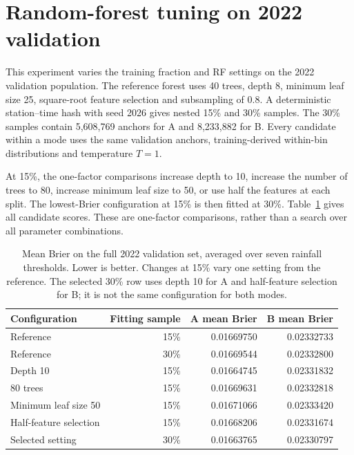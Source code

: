 \section{Random-forest tuning on 2022 validation}\label{sec:rfsensitivity}

This experiment varies the training fraction and RF settings on the 2022 validation population. The reference forest uses 40 trees, depth 8, minimum leaf size 25, square-root feature selection and subsampling of 0.8. A deterministic station--time hash with seed 2026 gives nested 15\% and 30\% samples. The 30\% samples contain 5,608,769 anchors for A and 8,233,882 for B. Every candidate within a mode uses the same validation anchors, training-derived within-bin distributions and temperature $T=1$.

At 15\%, the one-factor comparisons increase depth to 10, increase the number of trees to 80, increase minimum leaf size to 50, or use half the features at each split. The lowest-Brier configuration at 15\% is then fitted at 30\%. Table~\ref{tab:rfsensitivity} gives all candidate scores. These are one-factor comparisons, rather than a search over all parameter combinations.

\par
\begin{table}[htbp]\centering\small
\begin{tabular}{lrrr}\toprule
Configuration & Fitting sample & A mean Brier & B mean Brier\\\midrule
Reference & 15\% & 0.01669750 & 0.02332733 \\
Reference & 30\% & 0.01669544 & 0.02332800 \\
Depth 10 & 15\% & 0.01664745 & 0.02331832 \\
80 trees & 15\% & 0.01669631 & 0.02332818 \\
Minimum leaf size 50 & 15\% & 0.01671066 & 0.02333420 \\
Half-feature selection & 15\% & 0.01668206 & 0.02331674 \\
Selected setting & 30\% & 0.01663765 & 0.02330797 \\
\bottomrule\end{tabular}
\caption{Mean Brier on the full 2022 validation set, averaged over seven rainfall thresholds. Lower is better. Changes at 15\% vary one setting from the reference. The selected 30\% row uses depth 10 for A and half-feature selection for B; it is not the same configuration for both modes.}
\label{tab:rfsensitivity}\end{table}\par


